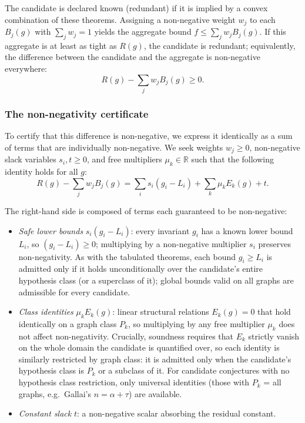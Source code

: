 \documentclass[]{ceurart}
\begin{document}
    The candidate is declared known (redundant) if it is implied by a convex combination of these theorems. Assigning a non-negative weight $w_j$ to each $B_j(g)$ with $\sum_j w_j = 1$ yields the aggregate bound $f \le \sum_j w_j B_j(g)$. If this aggregate is at least as tight as $R(g)$, the
  candidate is redundant; equivalently, the difference between the candidate and the aggregate is non-negative everywhere:
    \[
        R(g) - \sum_j w_j B_j(g) \ge 0.
    \]
    
    \subsubsection*{The non-negativity certificate}
    
    To certify that this difference is non-negative, we express it identically as a sum of terms that are individually non-negative. We seek weights $w_j \ge 0$, non-negative slack variables $s_i, t \ge 0$, and free multipliers $\mu_k \in \mathbb{R}$ such that the following identity holds for all $g$:
    \[
        R(g) - \sum_j w_j B_j(g) = \sum_i s_i(g_i - L_i) + \sum_k \mu_k E_k(g) + t.
    \]

    The right-hand side is composed of terms each guaranteed to be non-negative:
    \begin{itemize}
        \item \emph{Safe lower bounds} $s_i(g_i - L_i)$: every invariant $g_i$ has a known lower bound $L_i$, so $(g_i - L_i) \ge 0$; multiplying by a non-negative
multiplier $s_i$ preserves non-negativity. As with the tabulated theorems,
each bound $g_i \ge L_i$ is admitted only if it holds unconditionally over the
candidate's entire hypothesis class (or a superclass of it); global bounds
valid on all graphs are admissible for every candidate.
        \item \emph{Class identities} $\mu_k E_k(g)$: linear structural relations $E_k(g)=0$ that hold identically on a graph class $P_k$, so multiplying by any free multiplier $\mu_k$ does not affect non-negativity. Crucially, soundness requires that $E_k$ strictly vanish on the whole domain the
  candidate is quantified over, so each identity is similarly restricted by graph class: it is admitted only when the candidate's hypothesis class is $P_k$ or a subclass of it. For candidate conjectures with no hypothesis class restriction, only universal identities (those with $P_k$ = all graphs, e.g.\ Gallai's
  $n=\alpha+\tau$) are available.
        \item \emph{Constant slack} $t$: a non-negative scalar absorbing the residual constant.
    \end{itemize}
\end{document}
